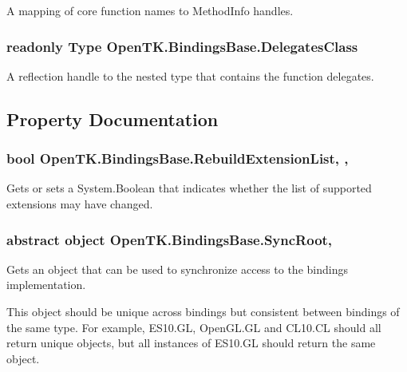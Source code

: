 A mapping of core function names to Method\-Info handles. 

\hypertarget{class_open_t_k_1_1_bindings_base_af8e7fd368c9a04ee49117cf9645f513b}{
\subsubsection[{Delegates\-Class}]{\setlength{\rightskip}{0pt plus 5cm}readonly Type Open\-T\-K.\-Bindings\-Base.\-Delegates\-Class\hspace{0.3cm}{\ttfamily [protected]}}}\label{class_open_t_k_1_1_bindings_base_af8e7fd368c9a04ee49117cf9645f513b}


A reflection handle to the nested type that contains the function delegates. 



\subsection{Property Documentation}
\hypertarget{class_open_t_k_1_1_bindings_base_afb1af0b310e3cdcf1cb0302b9f5d283d}{
\subsubsection[{Rebuild\-Extension\-List}]{\setlength{\rightskip}{0pt plus 5cm}bool Open\-T\-K.\-Bindings\-Base.\-Rebuild\-Extension\-List\hspace{0.3cm}{\ttfamily [get]}, {\ttfamily [set]}, {\ttfamily [protected]}}}\label{class_open_t_k_1_1_bindings_base_afb1af0b310e3cdcf1cb0302b9f5d283d}


Gets or sets a System.\-Boolean that indicates whether the list of supported extensions may have changed. 

\hypertarget{class_open_t_k_1_1_bindings_base_a0063e041acf286bac5b0518ae2c93bda}{
\subsubsection[{Sync\-Root}]{\setlength{\rightskip}{0pt plus 5cm}abstract object Open\-T\-K.\-Bindings\-Base.\-Sync\-Root\hspace{0.3cm}{\ttfamily [get]}, {\ttfamily [protected]}}}\label{class_open_t_k_1_1_bindings_base_a0063e041acf286bac5b0518ae2c93bda}


Gets an object that can be used to synchronize access to the bindings implementation. 

This object should be unique across bindings but consistent between bindings of the same type. For example, E\-S10.\-G\-L, Open\-G\-L.\-G\-L and C\-L10.\-C\-L should all return unique objects, but all instances of E\-S10.\-G\-L should return the same object.